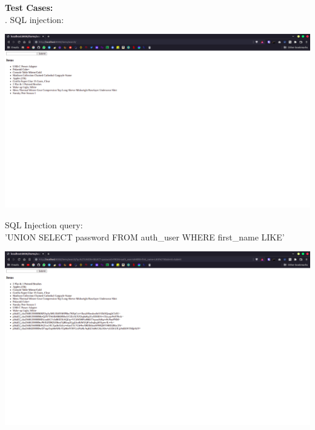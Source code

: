 \documentclass[a4paper, 12pt, fleqn]{article}
\begin{document}
\newpage
\section*{}

\textbf{Test Cases:} \\

. SQL injection:

\begin{center}
	\vspace{0.1cm}
	\includegraphics[scale=0.25]{sql_before}
\end{center}

\noindent
SQL Injection query: \\'UNION SELECT password FROM auth\_user WHERE first\_name LIKE'
\begin{center}
	\vspace{0.1cm}
	\includegraphics[scale=0.25]{sql_after}
\end{center}
\end{document}
